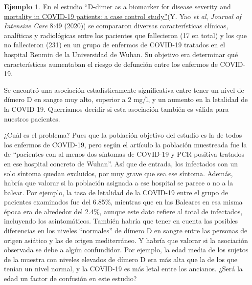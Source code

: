 \documentclass[
]{book}
\theoremstyle{definition}
\theoremstyle{definition}
\newtheorem{example}{Ejemplo}[chapter]
\theoremstyle{definition}
\theoremstyle{definition}
\theoremstyle{remark}
\begin{document}
\begin{example}
\protect\hypertarget{exm:unnamed-chunk-61}{}\label{exm:unnamed-chunk-61}En el estudio \href{https://link.springer.com/article/10.1186/s40560-020-00466-z}{``D-dimer as a biomarker for disease severity and mortality in COVID-19 patients: a case control study''}(Y. Yao \emph{et al}, \emph{Journal of Intensive Care} 8:49 (2020)) se compararon diversas características clínicas, analíticas y radiológicas entre los pacientes que fallecieron (17 en total) y los que no fallecieron (231) en un grupo de enfermos de COVID-19 tratados en el hospital Renmin de la Universidad de Wuhan. Su objetivo era determinar qué características aumentaban el riesgo de defunción entre los enfermos de COVID-19.

Se encontró una asociación estadísticamente significativa entre tener un nivel de dímero D en sangre muy alto, superior a 2 mg/l, y un aumento en la letalidad de la COVID-19. Querríamos decidir si esta asociación también es válida para nuestros pacientes.
\end{example}

¿Cuál es el problema? Pues que la población objetivo del estudio es la de todos los enfermos de COVID-19, pero según el artículo la población muestreada fue la de ``pacientes con al menos dos síntomas de COVID-19 y PCR positiva tratados en ese hospital concreto de Wuhan''. Así que de entrada, los infectados con un solo síntoma quedan excluidos, por muy grave que sea ese síntoma. Además, habría que valorar si la población asignada a ese hospital se parece o no a la balear. Por ejemplo, la tasa de letalidad de la COVID-19 entre el grupo de pacientes examinados fue del 6.85\%, mientras que en las Baleares en esa misma época era de alrededor del 2.4\%, aunque este dato refiere al total de infectados, incluyendo los asintomáticos. También habría que tener en cuenta las posibles diferencias en los niveles ``normales'' de dímero D en sangre entre las personas de origen asiático y las de origen mediterráneo. Y habría que valorar si la asociación observada se debe a algún confundidor. Por ejemplo, la edad media de los sujetos de la muestra con niveles elevados de dímero D era más alta que la de los que tenían un nivel normal, y la COVID-19 es más letal entre los ancianos. ¿Será la edad un factor de confusión en este estudio?
\end{document}
